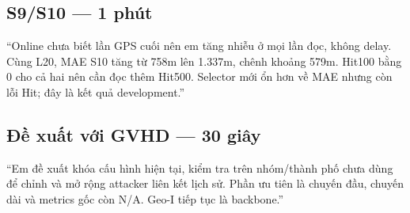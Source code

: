 \documentclass[11pt,a4paper]{article}
\begin{document}
\subsection*{S9/S10 — 1 phút}
“Online chưa biết lần GPS cuối nên em tăng nhiễu ở mọi lần đọc, không delay. Cùng L20, MAE S10 tăng từ 758m lên 1.337m, chênh khoảng 579m. Hit100 bằng 0 cho cả hai nên cần đọc thêm Hit500. Selector mới ổn hơn về MAE nhưng còn lỗi Hit; đây là kết quả development.”

\subsection*{Đề xuất với GVHD — 30 giây}
“Em đề xuất khóa cấu hình hiện tại, kiểm tra trên nhóm/thành phố chưa dùng để chỉnh và mở rộng attacker liên kết lịch sử. Phần ưu tiên là chuyến đầu, chuyến dài và metrics gốc còn N/A. Geo-I tiếp tục là backbone.”

\clearpage
\end{document}
